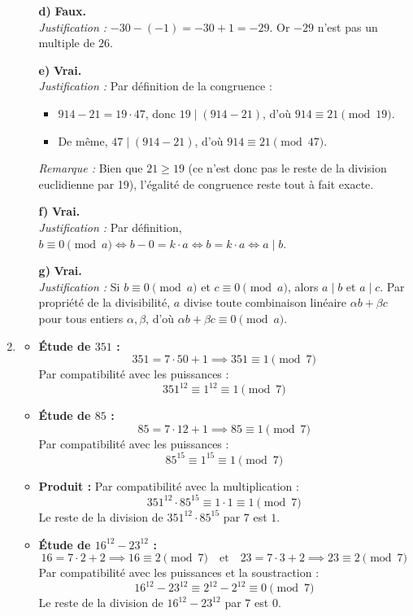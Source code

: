 \begin{enumerate}[label=\thechapter.\arabic*, font=\bfseries, itemsep=7mm,labelsep*=3mm,left=0mm]
\begin{enumerate}[label=\roman*),itemsep=5mm,left=-1mm,labelsep*=2mm]
	\item[\textbf{d)}] \textbf{Faux.} \\
	\textit{Justification :} $-30 - (-1) = -30 + 1 = -29$. Or $-29$ n'est pas un multiple de $26$.
	
	\item[\textbf{e)}] \textbf{Vrai.} \\
	\textit{Justification :} Par définition de la congruence :
	\begin{itemize}
		\item $914 - 21 = 19 \cdot 47$, donc $19 \mid (914 - 21)$, d'où $914 \equiv 21 \pmod {19}$.
		\item De même, $47 \mid (914 - 21)$, d'où $914 \equiv 21 \pmod {47}$.
	\end{itemize}
	\textit{Remarque :} Bien que $21 \ge 19$ (ce n'est donc pas le reste de la division euclidienne par 19), l'égalité de congruence reste tout à fait exacte.
	
	\item[\textbf{f)}] \textbf{Vrai.} \\
	\textit{Justification :} Par définition, $b \equiv 0 \pmod a \iff b - 0 = k \cdot a \iff b = k \cdot a \iff a \mid b$.
	
	\item[\textbf{g)}] \textbf{Vrai.} \\
	\textit{Justification :} Si $b \equiv 0 \pmod a$ et $c \equiv 0 \pmod a$, alors $a \mid b$ et $a \mid c$. Par propriété de la divisibilité, $a$ divise toute combinaison linéaire $\alpha b + \beta c$ pour tous entiers $\alpha, \beta$, d'où $\alpha b + \beta c \equiv 0 \pmod a$.
\end{enumerate}

\item

\begin{itemize}
	\item \textbf{Étude de $351$ :}
	$$351 = 7 \cdot 50 + 1 \implies 351 \equiv 1 \pmod 7$$
	Par compatibilité avec les puissances :
	$$351^{12} \equiv 1^{12} \equiv 1 \pmod 7$$
	
	\item \textbf{Étude de $85$ :}
	$$85 = 7 \cdot 12 + 1 \implies 85 \equiv 1 \pmod 7$$
	Par compatibilité avec les puissances :
	$$85^{15} \equiv 1^{15} \equiv 1 \pmod 7$$
	
	\item \textbf{Produit :}
	Par compatibilité avec la multiplication :
	$$351^{12} \cdot 85^{15} \equiv 1 \cdot 1 \equiv 1 \pmod 7$$
	Le reste de la division de $351^{12} \cdot 85^{15}$ par $7$ est $1$.
	\item \textbf{Étude de $16^{12}-23^{12}$ :}
	$$16 = 7 \cdot 2 + 2 \implies 16 \equiv 2 \pmod 7 \quad \text{et} \quad 23 = 7 \cdot 3 + 2 \implies 23 \equiv 2 \pmod 7$$
	Par compatibilité avec les puissances et la soustraction :
	$$16^{12}-23^{12} \equiv 2^{12}-2^{12} \equiv 0 \pmod 7$$
	Le reste de la division de $16^{12}-23^{12}$ par $7$ est $0$.
\end{itemize}




\end{enumerate}
